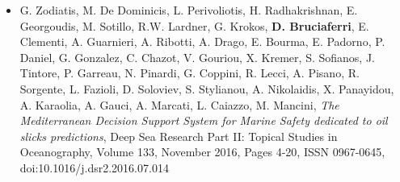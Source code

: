\documentclass[a4paper, oneside, final]{scrartcl}
\begin{document}
\begin{itemize}
\item G. Zodiatis, M. De Dominicis, L. Perivoliotis, H. Radhakrishnan, E. Georgoudis, M. Sotillo, R.W. Lardner, G. Krokos, \textbf{D. Bruciaferri}, E. Clementi, A. Guarnieri, A. Ribotti, A. Drago, E. Bourma, E. Padorno, P. Daniel, G. Gonzalez, C. Chazot, V. Gouriou, X. Kremer, S. Sofianos, J. Tintore, P. Garreau, N. Pinardi, G. Coppini, R. Lecci, A. Pisano, R. Sorgente, L. Fazioli, D. Soloviev, S. Stylianou, A. Nikolaidis, X. Panayidou, A. Karaolia, A. Gauci, A. Marcati, L. Caiazzo, M. Mancini, \textit{The Mediterranean Decision Support System for Marine Safety dedicated to oil slicks predictions}, Deep Sea Research Part II: Topical Studies in Oceanography, Volume 133, November 2016, Pages 4-20, ISSN 0967-0645, doi:10.1016/j.dsr2.2016.07.014
\end{itemize}
\end{document}
